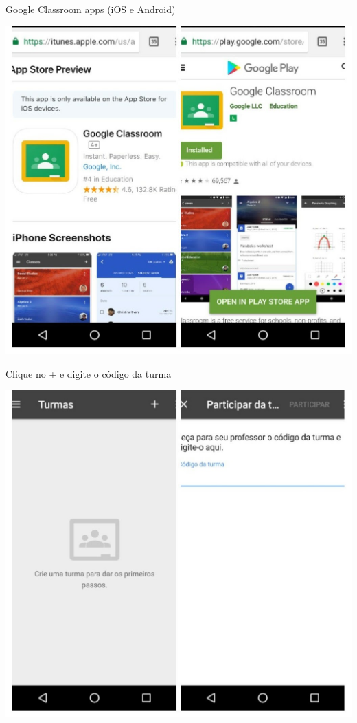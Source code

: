\documentclass{beamer}
\begin{document}
\begin{frame}{\scriptsize Google Classroom apps (iOS e Android)}
  \begin{center}
    \includegraphics[height=\textheight]{Cap1/gclassroom-apps}
  \end{center}
\end{frame}

\begin{frame}{\scriptsize Clique no + e digite o código da turma}
  \begin{center}
    \includegraphics[height=\textheight]{Cap1/gclassroom-turma}
  \end{center}
\end{frame}
\end{document}
